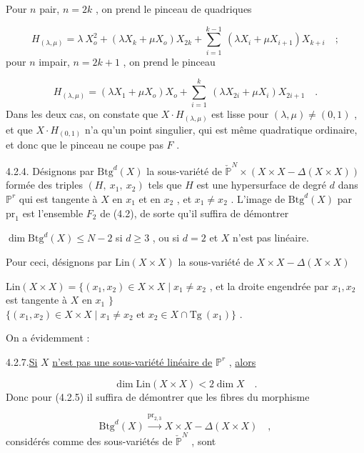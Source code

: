 Pour $n$ pair, $n = 2k$ , on prend le pinceau de quadriques

\begin{equation}\tag{4.2.2}
H_{(\lambda,\mu)} = \lambda\ X_o^2 + (\lambda X_k + \mu X_o) X_{2k} + \sum_{i=1}^{k-1}\ (\lambda X_i + \mu X_{i+1}) X_{k+i} \quad ;
\end{equation}
pour $n$ impair, $n = 2k+1$ , on prend le pinceau

\begin{equation}\tag{4.2.3}
H_{(\lambda,\mu)} = (\lambda X_1 + \mu X_o) X_o + \sum_{i=1}^{k}\ (\lambda X_{2i} + \mu X_i) X_{2i+1} \quad .
\end{equation}
Dans les deux cas, on constate que $X \cdot H_{(\lambda,\mu)}$ est lisse pour $(\lambda,\mu) \neq (0,1)$ , et que $X \cdot H_{(0,1)}$ n'a qu'un point singulier, qui est même quadratique ordinaire, et donc que le pinceau ne coupe pas $F$ .

4.2.4. Désignons par $\mathrm{Btg}^d(X)$ la sous-variété de $\check{\mathbb{P}}^N \times (X \times X - \Delta(X \times X))$ formée des triples $(H,\ x_1,\ x_2)$ tels que $H$ est une hypersurface de degré $d$ dans $\mathbb{P}^r$ qui est tangente à $X$ en $x_1$ et en $x_2$ , et $x_1 \neq x_2$ . L'image de $\mathrm{Btg}^d(X)$ par $\mathrm{pr}_1$ est l'ensemble $F_2$ de (4.2), de sorte qu'il suffira de démontrer

$\dim \mathrm{Btg}^d(X) \leq N-2$ si $d \geq 3$ , ou si $d = 2$ et $X$ n'est pas linéaire.

Pour ceci, désignons par $\mathrm{Lin}(X \times X)$ la sous-variété de $X \times X - \Delta(X \times X)$

$\mathrm{Lin}(X \times X) = \{(x_1,x_2) \in X \times X \mid x_1 \neq x_2$ , et la droite engendrée par $x_1,x_2$ est tangente à $X$ en $x_1$ $\}$ \\ $\{(x_1,x_2) \in X \times X \mid x_1 \neq x_2$ et $x_2 \in X \cap \mathrm{Tg}\ (x_1)\}$ .



On a évidemment :

4.2.7.\quad \underline{Si} $X$ \underline{n'est pas une sous-variété linéaire de} $\mathbb{P}^r$ , \underline{alors}

\begin{equation*}
\dim \mathrm{Lin}(X \times X) < 2\dim X \quad .
\end{equation*}
Donc pour (4.2.5) il suffira de démontrer que les fibres du morphisme

\begin{equation}\tag{4.2.8}
\mathrm{Btg}^d(X) \stackrel{\mathrm{pr}_{2,3}}{\longrightarrow} X \times X - \Delta(X \times X) \quad ,
\end{equation}
considérés comme des sous-variétés de $\check{\mathbb{P}}^N$ , sont


